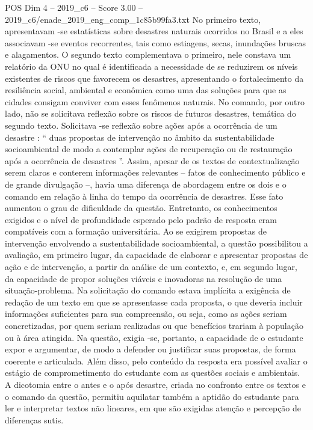 \begin{textsample}{POS Dim 4 – 2019\_c6 – Score 3.00 – 2019\_c6/enade\_2019\_eng\_comp\_1c85b99fa3.txt}
No primeiro texto, apresentavam -se estatísticas sobre desastres naturais ocorridos no Brasil e a eles associavam -se eventos recorrentes, tais como estiagens, secas, inundações bruscas e alagamentos.
O segundo texto complementava o primeiro, nele constava um relatório da ONU no qual é identificada a necessidade de se reduzirem os níveis existentes de riscos que favorecem os desastres, apresentando o fortalecimento da resiliência social, ambiental e econômica como uma das soluções para que as cidades consigam conviver com esses fenômenos naturais.
No comando, por outro lado, não se solicitava reflexão sobre os riscos de futuros desastres, temática do segundo texto.
Solicitava -se reflexão sobre ações após a ocorrência de um desastre : “ duas propostas de intervenção no âmbito da sustentabilidade socioambiental de modo a contemplar ações de recuperação ou de restauração após a ocorrência de desastres ”.
Assim, apesar de os textos de contextualização serem claros e conterem informações relevantes – fatos de conhecimento público e de grande divulgação –, havia uma diferença de abordagem entre os dois e o comando em relação à linha do tempo da ocorrência de desastres.
Esse fato aumentou o grau de dificuldade da questão.
Entretanto, os conhecimentos exigidos e o nível de profundidade esperado pelo padrão de resposta eram compatíveis com a formação universitária.
Ao se exigirem propostas de intervenção envolvendo a sustentabilidade socioambiental, a questão possibilitou a avaliação, em primeiro lugar, da capacidade de elaborar e apresentar propostas de ação e de intervenção, a partir da análise de um contexto, e, em segundo lugar, da capacidade de propor soluções viáveis e inovadoras na resolução de uma situação-problema.
Na solicitação do comando estava implícita a exigência de redação de um texto em que se apresentasse cada proposta, o que deveria incluir informações suficientes para sua compreensão, ou seja, como as ações seriam concretizadas, por quem seriam realizadas ou que benefícios trariam à população ou à área atingida.
Na questão, exigia -se, portanto, a capacidade de o estudante expor e argumentar, de modo a defender ou justificar suas propostas, de forma coerente e articulada.
Além disso, pelo conteúdo da resposta era possível avaliar o estágio de comprometimento do estudante com as questões sociais e ambientais.
A dicotomia entre o antes e o após desastre, criada no confronto entre os textos e o comando da questão, permitiu aquilatar também a aptidão do estudante para ler e interpretar textos não lineares, em que são exigidas atenção e percepção de diferenças sutis.

\end{textsample}
